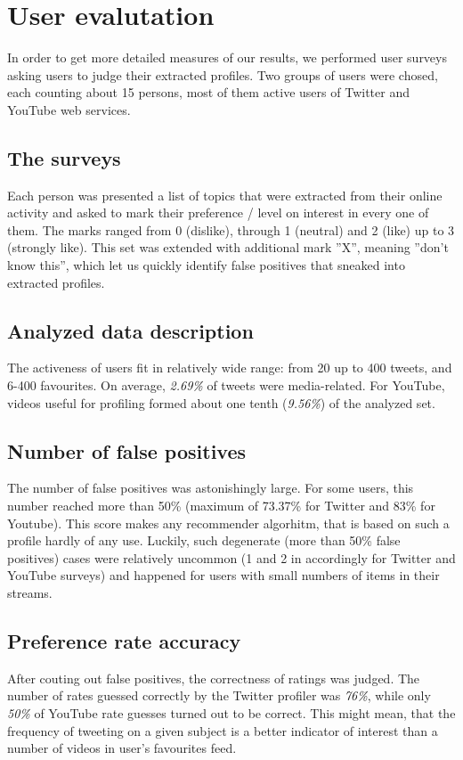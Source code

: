\section{User evalutation}
In order to get more detailed measures of our results, we performed user surveys
asking users to judge their extracted profiles. Two groups of users were chosed,
each counting about 15 persons, most of them active users of Twitter and YouTube
web services.

\subsection{The surveys}

Each person was presented a list of topics that were extracted from their online
activity and asked to mark their preference / level on interest in every one of
them. The marks ranged from 0 (dislike), through 1 (neutral) and 2 (like) up to
3 (strongly like). This set was extended with additional mark ''X'', meaning
''don't know this'', which let us quickly identify false positives that sneaked
into extracted profiles.

\subsection{Analyzed data description}
The activeness of users fit in relatively wide range: from 20 up to 400 tweets,
and 6-400 favourites. On average, \textit{2.69\%} of tweets were media-related.
For YouTube, videos useful for profiling formed about one tenth (\textit{9.56\%})
of the analyzed set.

\subsection{Number of false positives}
The number of false positives was astonishingly large. For some users, this
number reached more than 50\% (maximum of 73.37\% for Twitter and 83\% for
Youtube). This score makes any
recommender algorhitm, that is based on such a profile hardly of any use.
Luckily, such degenerate (more than 50\% false positives) cases were relatively
uncommon (1 and 2 in accordingly for Twitter and YouTube surveys) and happened
for users with small numbers of items in their streams.

\subsection{Preference rate accuracy}
After couting out false positives, the correctness of ratings was judged. The
number of rates guessed correctly by the Twitter profiler was \textit{76\%},
while only \textit{50\%} of YouTube rate guesses turned out to be correct. This
might mean, that the frequency of tweeting on a given subject is a better
indicator of interest than a number of videos in user's favourites feed.
